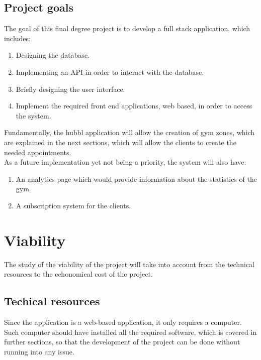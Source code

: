 \documentclass[a4paper, 12pt, oneside]{book}
\begin{document}
\section{Project goals}
The goal of this final degree project is to develop a full stack application, which includes:
\begin{enumerate}[label = -]
	\item Designing the database.
	\item Implementing an API in order to interact with the database.
	\item Briefly designing the user interface.
	\item Implement the required front end applications, web based, in order to access the system.
\end{enumerate}
Fundamentally, the hubbl application will allow the creation of gym zones, which are explained in the next sections, which will allow the clients to create the needed appointments.
\\[8pt]
As a future implementation yet not being a priority, the system will also have:
\begin{enumerate}[label = -]
	\item An analytics page which would provide information about the statistics of the gym.
	\item A subscription system for the clients.
\end{enumerate}
\chapter{Viability}
The study of the viability of the project will take into account from the technical resources to the echonomical cost of the project.
\section{Techical resources}
Since the application is a web-based application, it only requires a computer. Such computer should have installed all the required software, which is covered in further sections, so that the development of the project can be done without running into any issue.
\end{document}
